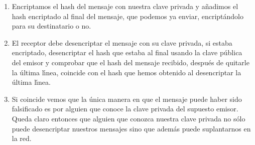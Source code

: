\begin{enumerate}
\item Encriptamos el hash del mensaje {\sc con nuestra clave privada} y
a\~nadimos el hash encriptado al final del mensaje, que podemos ya enviar, 
encript\'andolo para su destinatario o no.
 
 \item El receptor debe desencriptar el mensaje con su clave privada, si estaba
encriptado,  desencriptar el hash que estaba al final usando la {\sc clave
p\'ublica del emisor} y comprobar que el hash del mensaje recibido, despu\'es de
quitarle la \'ultima l\'{\i}nea, coincide con el hash que hemos obtenido al
desencriptar la \'ultima l\'{\i}nea. 

\item Si coincide vemos que la \'unica manera en que el mensaje puede haber sido
falsificado es por alguien que conoce la clave privada del supuesto emisor.
Queda claro entonces que alguien que conozca nuestra clave privada no s\'olo
puede desencriptar nuestros mensajes sino que adem\'as puede suplantarnos en la
red. 
 \end{enumerate}

\bigskip


